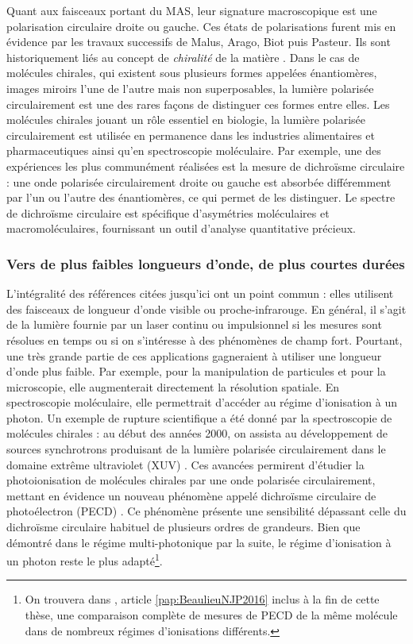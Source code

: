 Quant aux faisceaux portant du MAS, leur signature macroscopique est une polarisation circulaire droite ou gauche. Ces états de polarisations furent mis en évidence par les travaux successifs de Malus, Arago, Biot puis Pasteur. Ils sont historiquement liés au concept de \textit{chiralité} de la matière . Dans le cas de molécules chirales, qui existent sous plusieurs formes appelées énantiomères, images miroirs l'une de l'autre mais non superposables, la lumière polarisée circulairement est une des rares façons de distinguer ces formes entre elles. Les molécules chirales jouant un rôle essentiel en biologie, la lumière polarisée circulairement est utilisée en permanence dans les industries alimentaires et pharmaceutiques ainsi qu'en spectroscopie moléculaire. Par exemple, une des expériences les plus communément réalisées est la mesure de dichroïsme circulaire : une onde polarisée circulairement droite ou gauche est absorbée différemment par l'un ou l'autre des énantiomères, ce qui permet de les distinguer. Le spectre de dichroïsme circulaire est spécifique d’asymétries moléculaires et macromoléculaires, fournissant un outil d'analyse quantitative précieux.

\subsubsection{Vers de plus faibles longueurs d'onde, de plus courtes durées}
L'intégralité des références citées jusqu'ici ont un point commun : elles utilisent des faisceaux de longueur d'onde visible ou proche-infrarouge. En général, il s'agit de la lumière fournie par un laser continu ou impulsionnel si les mesures sont résolues en temps ou si on s'intéresse à des phénomènes de champ fort. Pourtant, une très grande partie de ces applications gagneraient à utiliser une longueur d'onde plus faible. Par exemple, pour la manipulation de particules et pour la microscopie, elle augmenterait directement la résolution spatiale. En spectroscopie moléculaire, elle permettrait d'accéder au régime d'ionisation à un photon. Un exemple de rupture scientifique a été donné par la spectroscopie de molécules chirales : au début des années 2000, on assista au développement de sources synchrotrons produisant de la lumière polarisée circulairement dans le domaine extrême ultraviolet (XUV) . Ces avancées permirent d'étudier la photoionisation de molécules chirales par une onde polarisée circulairement, mettant en évidence un nouveau phénomène appelé dichroïsme circulaire de photoélectron (PECD) . Ce phénomène présente une sensibilité dépassant celle du dichroïsme circulaire habituel de plusieurs ordres de grandeurs. Bien que démontré dans le régime multi-photonique par la suite, le régime d'ionisation à un photon reste le plus adapté\footnote{On trouvera dans , article \ref{pap:BeaulieuNJP2016} inclus à la fin de cette thèse, une comparaison complète de mesures de PECD de la même molécule dans de nombreux régimes d'ionisations différents.}.

